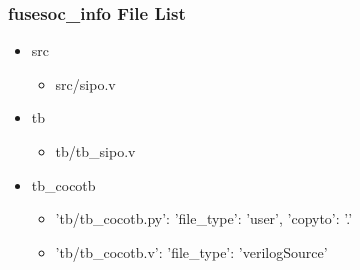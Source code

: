 \subsubsection{fusesoc\_info File List}
\begin{itemize}
\item src
	\begin{itemize}
	\item src/sipo.v
	\end{itemize}
\item tb
	\begin{itemize}
	\item tb/tb\_sipo.v
	\end{itemize}
\item tb\_cocotb
	\begin{itemize}
	\item {'tb/tb\_cocotb.py': {'file\_type': 'user', 'copyto': '.'}}
	\item {'tb/tb\_cocotb.v': {'file\_type': 'verilogSource'}}
	\end{itemize}
\end{itemize}
